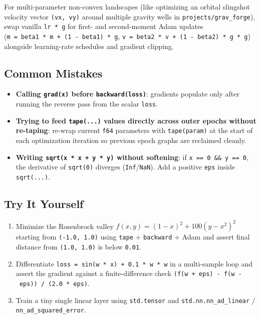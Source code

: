 \documentclass[
  english,
  oneside]{book}
\providecommand{\tightlist}{%
  \setlength{\itemsep}{0pt}\setlength{\parskip}{0pt}}
\begin{document}
For multi-parameter non-convex landscapes (like optimizing an orbital
slingshot velocity vector \texttt{(vx,\ vy)} around multiple gravity
wells in \texttt{projects/grav\_forge}), swap vanilla \texttt{lr\ *\ g}
for first- and second-moment Adam updates
(\texttt{m\ =\ beta1\ *\ m\ +\ (1\ -\ beta1)\ *\ g},
\texttt{v\ =\ beta2\ *\ v\ +\ (1\ -\ beta2)\ *\ g\ *\ g}) alongside
learning-rate schedules and gradient clipping.

\subsection{Common Mistakes}\label{common-mistakes-12}

\begin{itemize}
\tightlist
\item
  \textbf{Calling \texttt{grad(x)} before \texttt{backward(loss)}}:
  gradients populate only after running the reverse pass from the scalar
  \texttt{loss}.
\item
  \textbf{Trying to feed \texttt{tape(...)} values directly across outer
  epochs without re-taping}: re-wrap current \texttt{f64} parameters
  with \texttt{tape(param)} at the start of each optimization iteration
  so previous epoch graphs are reclaimed cleanly.
\item
  \textbf{Writing \texttt{sqrt(x\ *\ x\ +\ y\ *\ y)} without softening}:
  if \texttt{x\ ==\ 0\ \&\&\ y\ ==\ 0}, the derivative of
  \texttt{sqrt(0)} diverges (\texttt{Inf}/\texttt{NaN}). Add a positive
  \texttt{eps} inside \texttt{sqrt(...)}.
\end{itemize}

\subsection{Try It Yourself}\label{try-it-yourself-12}

\begin{enumerate}
\def\labelenumi{\arabic{enumi}.}
\tightlist
\item
  Minimize the Rosenbrock valley
  \(f(x, y) = (1 - x)^2 + 100 (y - x^2)^2\) starting from
  \texttt{(-1.0,\ 1.0)} using \texttt{tape} + \texttt{backward} + Adam
  and assert final distance from \texttt{(1.0,\ 1.0)} is below
  \texttt{0.01}.
\item
  Differentiate \texttt{loss\ =\ sin(w\ *\ x)\ +\ 0.1\ *\ w\ *\ w} in a
  multi-sample loop and assert the gradient against a finite-difference
  check \texttt{(f(w\ +\ eps)\ -\ f(w\ -\ eps))\ /\ (2.0\ *\ eps)}.
\item
  Train a tiny single linear layer using \texttt{std.tensor} and
  \texttt{std.nn.nn\_ad\_linear} / \texttt{nn\_ad\_squared\_error}.
\end{enumerate}
\end{document}
